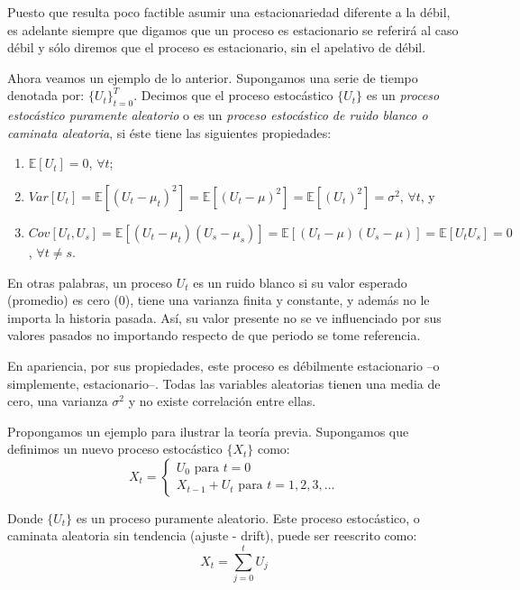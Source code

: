 \documentclass[
]{book}
\begin{document}
Puesto que resulta poco factible asumir una estacionariedad diferente a la débil, es adelante siempre que digamos que un proceso es estacionario se referirá al caso débil y sólo diremos que el proceso es estacionario, sin el apelativo de débil.

Ahora veamos un ejemplo de lo anterior. Supongamos una serie de tiempo denotada por: \(\{U_t\}^T_{t = 0}\). Decimos que el proceso estocástico \(\{U_t\}\) es un \emph{proceso estocástico puramente aleatorio} o es un \emph{proceso estocástico de ruido blanco o caminata aleatoria}, si éste tiene las siguientes propiedades:

\begin{enumerate}
\def\labelenumi{\arabic{enumi}.}
\item
  \(\mathbb{E}[U_t] = 0\), \(\forall t\);
\item
  \(Var[U_t] = \mathbb{E}[(U_t - \mu_t)^2] = \mathbb{E}[(U_t - \mu)^2] = \mathbb{E}[(U_t)^2] = \sigma^2\), \(\forall t\), y
\item
  \(Cov[U_t,U_s] = \mathbb{E}[(U_t - \mu_t)(U_s - \mu_s)] = \mathbb{E}[(U_t - \mu)(U_s - \mu)] = \mathbb{E}[U_t U_s] = 0\), \(\forall t \neq s\).
\end{enumerate}

En otras palabras, un proceso \(U_t\) es un ruido blanco si su valor esperado (promedio) es cero (0), tiene una varianza finita y constante, y además no le importa la historia pasada. Así, su valor presente no se ve influenciado por sus valores pasados no importando respecto de que periodo se tome referencia.

En apariencia, por sus propiedades, este proceso es débilmente estacionario --o simplemente, estacionario--. Todas las variables aleatorias tienen una media de cero, una varianza \(\sigma^2\) y no existe correlación entre ellas.

Propongamos un ejemplo para ilustrar la teoría previa. Supongamos que definimos un nuevo proceso estocástico \(\{X_t\}\) como:
\begin{equation}
    X_t = \left\{ \begin{array}{l} U_0  \mbox{ para } t = 0 \\ X_{t-1} + U_t \mbox{ para } t = 1, 2, 3, \ldots \end{array}\right.
    \label{eq:em1}
\end{equation}

Donde \(\{ U_t \}\) es un proceso puramente aleatorio. Este proceso estocástico, o caminata aleatoria sin tendencia (ajuste - drift), puede ser reescrito como:
\begin{equation}
    X_t = \sum^t_{j = 0} U_j
    \label{eq:em2}
\end{equation}
\end{document}

